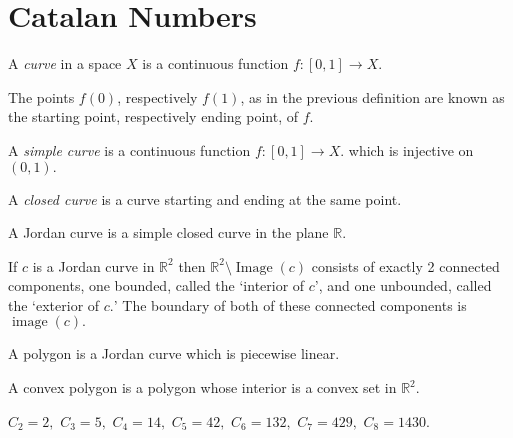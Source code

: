 \section{Catalan Numbers}
\begin{definition}[Curve]
	A \emph{curve} in a space $X$ is a continuous function $f \colon [0,1]
	\to X.$ 
\end{definition}
The points $f(0)$, respectively $f(1)$, as in the previous definition are known
as the starting point, respectively ending point, of $f.$
\begin{definition}
	A \emph{simple curve} is a continuous function $f \colon [0,1] \to X.$
	which is injective on $(0,1).$
\end{definition}
\begin{definition}
	A \emph{closed curve} is a curve starting and ending at the same
	point.
\end{definition}
\begin{definition}
	A Jordan curve is a simple closed curve in the plane $\mathbb{R}.$	
\end{definition}
\begin{theorem}
	If $c$ is a Jordan curve in $\mathbb{R}^2$ then $\mathbb{R}^2
	\setminus \operatorname{Image}(c)$ consists of exactly 2 
	connected components, one bounded, called the `interior of $c$',	and one unbounded,
	called the `exterior of $c.$' The boundary of both of these connected components is $\operatorname{image}(c).$
\end{theorem}

\begin{definition}[Polygon]
	A polygon is a Jordan curve which is piecewise linear.
\end{definition}
\begin{definition}
	A convex polygon is a polygon whose interior is a convex set in
	$\mathbb{R}^2.$
\end{definition}



$C_2 = 2,$ $C_3 = 5,$ $C_4 = 14,$ $C_5 = 42,$ $C_6 = 132,$ $C_7 = 429,$
$C_8 = 1430.$

